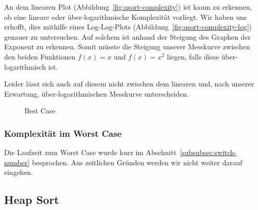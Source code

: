 An dem linearen Plot (Abbildung~\ref{fig:qsort-complexity})
ist kaum zu erkennen, ob eine lineare oder
über-logarithmische Komplexität vorliegt.
Wir haben uns erhofft, dies mithilfe eines Log-Log-Plots
(Abbildung~\ref{fig:qsort-complexity-log}) genauer zu untersuchen.
Auf solchem ist anhand der Steigung des Graphen der Exponent zu erkennen.
Somit müsste die Steigung unserer Messkurve zwischen den beiden Funktionen
\(f(x)=x\) und \(f(x)=x^2\) liegen, falls diese über-logarithmisch ist.

Leider lässt sich auch auf diesem nicht zwischen dem linearen und, nach
unserer Erwartung, über-logarithmischen Messkurve unterscheiden.

\begin{figure}[hbt]
    \centering
    \caption{Best Case}
\end{figure}

\subsubsection{Komplexität im Worst Case}\label{subsubsec:worst-case}
Die Laufzeit zum Worst Case wurde kurz im
Abschnitt~\ref{subsubsec:switch-number} besprochen.
Aus zeitlichen Gründen werden wir nicht weiter darauf eingehen.


\FloatBarrier

\subsection{Heap Sort}\label{subsec:heap-sort-laufzeit}

